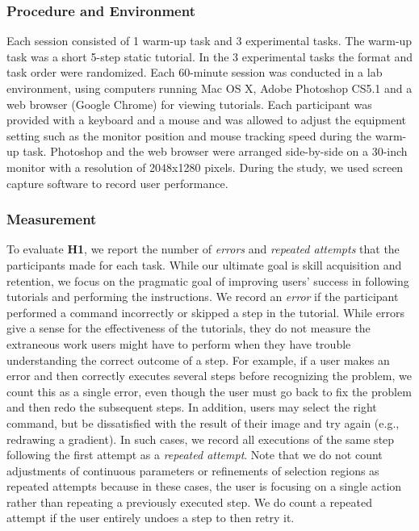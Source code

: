 \subsubsection{Procedure and Environment}
Each session consisted of 1 warm-up task and 3 experimental tasks. The warm-up task was a short 5-step static tutorial. In the 3 experimental tasks the format and task order were randomized. Each 60-minute session was conducted in a lab environment, using computers running Mac OS X, Adobe Photoshop CS5.1 and a web browser (Google Chrome) for viewing tutorials. Each participant was provided with a keyboard and a mouse and was allowed to adjust the equipment setting such as the monitor position and mouse tracking speed during the warm-up task. Photoshop and the web browser were arranged side-by-side on a 30-inch monitor with a resolution of 2048x1280 pixels. During the study, we used screen capture software to record user performance.

\subsubsection{Measurement}
To evaluate \textbf{H1}, we report the number of \emph{errors} and \emph{repeated attempts} that the participants made for each task. While our ultimate goal is skill acquisition and retention, we focus on the pragmatic goal of improving users' success in following tutorials and performing the instructions. We record an \emph{error} if the participant performed a command incorrectly or skipped a step in the tutorial. While errors give a sense for the effectiveness of the tutorials, they do not measure the extraneous work users might have to perform when they have trouble understanding the correct outcome of a step. For example, if a user makes an error and then correctly executes several steps before recognizing the problem, we count this as a single error, even though the user must go back to fix the problem and then redo the subsequent steps. In addition, users may select the right command, but be dissatisfied with the result of their image and try again (e.g., redrawing a gradient). In such cases, we record all executions of the same step following the first attempt as a \emph{repeated attempt}. Note that we do not count adjustments of continuous parameters or refinements of selection regions as repeated attempts because in these cases, the user is focusing on a single action rather than repeating a previously executed step. We do count a repeated attempt if the user entirely undoes a step to then retry it.

